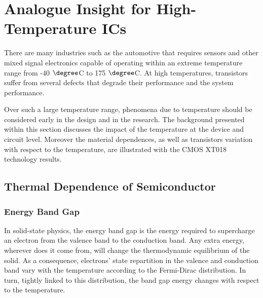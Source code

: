 
\chapter{Analogue Insight for High-Temperature ICs}
\label{sec:temperature-analogue}
\ifpdf
    \graphicspath{{Chapter2/Figs/Raster/}{Chapter2/Figs/PDF/}{Chapter2/Figs/}}
\else
    \graphicspath{{Chapter2/Figs/Vector/}{Chapter2/Figs/}}
\fi

There are many industries such as the automotive that requires sensors and other mixed signal electronics capable of operating within an extreme temperature range from -40 \(\degree \)C to 175 \(\degree \)C. At high temperatures, transistors suffer from several defects that degrade their performance and the system performance.

Over such a large temperature range, phenomena due to temperature should be considered early in the design and in the research. The background presented within this section discusses the impact of the temperature at the device and circuit level. Moreover the material dependences, as well as transistors variation with respect to the temperature, are illustrated with the CMOS XT018 technology results. %

\section{Thermal Dependence of Semiconductor}
\subsection{Energy Band Gap}        %
In solid-state physics, the energy band gap is the energy required to supercharge an electron from the valence band to the conduction band. Any extra energy, wherever does it come from, will change the thermodynamic equilibrium of the solid. As a consequence, electrons' state repartition in the valence and conduction band vary with the temperature according to the Fermi-Dirac distribution. In turn, tightly linked to this distribution, the band gap energy changes with respect to the temperature.

